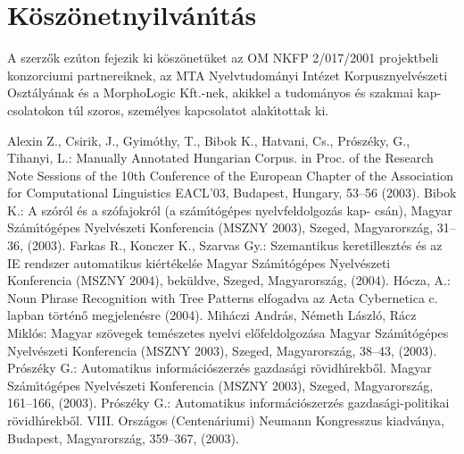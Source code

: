 \documentclass{llncs}
\begin{document}
\section{K\"osz\"onetnyilv\'an\'\i t\'as}
A szerz\H{o}k ez\'uton fejezik ki k\"osz\"onet\"uket az OM NKFP 2/017/2001
projektbeli konzorciumi partnereiknek, az MTA Nyelvtudom\'anyi Int\'ezet
Korpusznyelv\'eszeti Oszt\'aly\'anak \'es a MorphoLogic Kft.-nek, akikkel
a tudom\'anyos \'es szakmai kap- csolatokon t\'ul szoros, szem\'elyes
kapcsolatot alak\'\i tottak ki.
%
%
\begin{thebibliography}{15}
%
Alexin Z., Csirik, J., Gyim\'othy, T., Bibok K., Hatvani, Cs.,
Pr\'osz\'eky, G., Tihanyi, L.:
Manually Annotated Hungarian Corpus.
in Proc. of the Research Note Sessions of the 10th Conference
of the European Chapter of the Association for Computational
Linguistics EACL'03, Budapest, Hungary, 53--56 (2003).
%
Bibok K.:
A sz\'or\'ol \'es a sz\'ofajokr\'ol (a sz\'am\'\i t\'og\'epes nyelvfeldolgoz\'as kap- cs\'an),
Magyar Sz\'am\'\i t\'og\'epes Nyelv\'eszeti Konferencia (MSZNY 2003),
Szeged, Magyarorsz\'ag, 31--36, (2003).
%
Farkas R., Konczer K., Szarvas Gy.:
Szemantikus keretilleszt\'es \'es az IE rendszer automatikus ki\'ert\'ekel\'se
Magyar Sz\'am\'\i t\'og\'epes Nyelv\'eszeti Konferencia (MSZNY 2004),
bek\"uldve, Szeged, Magyarorsz\'ag, (2004).
%
H\'ocza, A.:
Noun Phrase Recognition with Tree Patterns
elfogadva az Acta Cybernetica c. lapban t\"ort\'en\H{o} megjelen\'esre (2004).
%
Mih\'aczi Andr\'as, N\'emeth L\'aszl\'o, R\'acz Mikl\'os:
Magyar sz\"ovegek tem\'eszetes nyelvi el\H{o}feldolgoz\'asa
Magyar Sz\'am\'\i t\'og\'epes Nyelv\'eszeti Konferencia (MSZNY 2003),
Szeged, Magyarorsz\'ag, 38--43, (2003).
%
Pr\'osz\'eky G.:
Automatikus inform\'aci\'oszerz\'es gazdas\'agi r\"ovidh\'\i rekb\H{o}l.
Magyar Sz\'am\'\i t\'og\'epes Nyelv\'eszeti Konferencia (MSZNY 2003),
Szeged, Magyarorsz\'ag, 161--166, (2003).
%
Pr\'osz\'eky G.:
Automatikus inform\'aci\'oszerz\'es gazdas\'agi-politikai r\"ovidh\'\i rekb\H{o}l.
VIII. Orsz\'agos (Centen\'ariumi) Neumann Kongresszus kiadv\'anya,
Budapest, Magyarorsz\'ag, 359--367, (2003).
%
\end{thebibliography}
\end{document}
